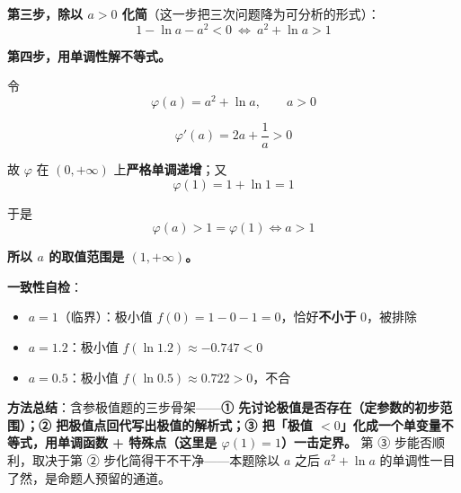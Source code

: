 \begin{answer}
\textbf{第三步，除以 $a>0$ 化简}（这一步把三次问题降为可分析的形式）：
\nopagebreak[4]
\[1-\ln a-a^{2}<0\ \Longleftrightarrow\ a^{2}+\ln a>1\]

\textbf{第四步，用单调性解不等式。}

令
\nopagebreak[4]
\[\varphi(a)=a^{2}+\ln a,\qquad a>0\]

\nopagebreak[4]
\[\varphi'(a)=2a+\frac1a>0\]

故 $\varphi$ 在 $(0,+\infty)$ 上\textbf{严格单调递增}；又
\nopagebreak[4]
\[\varphi(1)=1+\ln1=1\]

于是
\nopagebreak[4]
\[\varphi(a)>1=\varphi(1)\iff a>1\]

\textbf{所以 $a$ 的取值范围是 $(1,+\infty)$。}

\begin{gktip}
\textbf{一致性自检}：
\begin{itemize}
\item $a=1$（临界）：极小值 $f(0)=1-0-1=0$，恰好\textbf{不小于} $0$，被排除 
\item $a=1.2$：极小值 $f(\ln1.2)\approx-0.747<0$ 
\item $a=0.5$：极小值 $f(\ln0.5)\approx0.722>0$，不合 
\end{itemize}

\textbf{方法总结}：含参极值题的三步骨架——\textbf{① 先讨论极值是否存在（定参数的初步范围）；② 把极值点回代写出极值的解析式；③ 把「极值 $<0$」化成一个单变量不等式，用单调函数 + 特殊点（这里是 $\varphi(1)=1$）一击定界。} 第 ③ 步能否顺利，取决于第 ② 步化简得干不干净——本题除以 $a$ 之后 $a^{2}+\ln a$ 的单调性一目了然，是命题人预留的通道。
\end{gktip}



\par\medskip

\end{answer}
